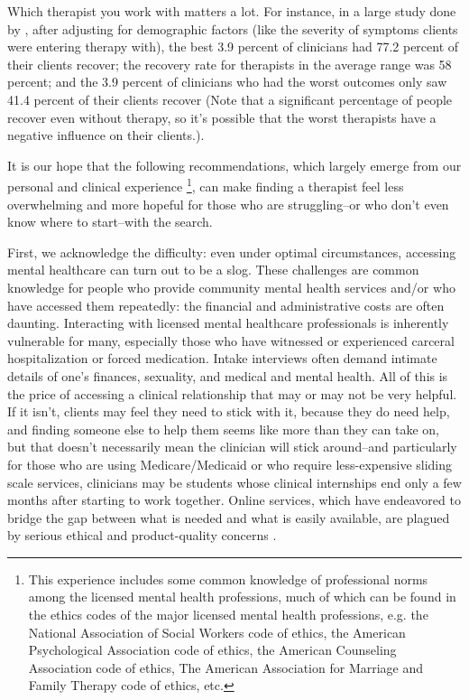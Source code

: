 \documentclass[12pt,letterpaper]{book}
\begin{document}
Which therapist you work with matters a lot. For instance, in a large study done by \textcite{firth2019therapistEffects}, after adjusting for demographic factors (like the severity of symptoms clients were entering therapy with), the best 3.9 percent of clinicians had 77.2 percent of their clients recover; the recovery rate for therapists in the average range was 58 percent; and the 3.9 percent of clinicians who had the worst outcomes only saw 41.4 percent of their clients recover (Note that a significant percentage of people recover even without therapy, so it's possible that the worst therapists have a negative influence on their clients.).

It is our hope that the following recommendations, which largely emerge from our personal and clinical experience \footnote{This experience includes some common knowledge of professional norms among the licensed mental health professions, much of which can be found in the ethics codes of the major licensed mental health professions, e.g. the National Association of Social Workers code of ethics, the American Psychological Association code of ethics, the American Counseling Association code of ethics, The American Association for Marriage and Family Therapy code of ethics, etc.}, can make finding a therapist feel less overwhelming and more hopeful for those who are struggling–or who don't even know where to start–with the search.

First, we acknowledge the difficulty: even under optimal circumstances, accessing mental healthcare can turn out to be a slog. These challenges are common knowledge for people who provide community mental health services and/or who have accessed them repeatedly: the financial and administrative costs are often daunting. Interacting with licensed mental healthcare professionals is inherently vulnerable for many, especially those who have witnessed or experienced carceral hospitalization or forced medication. Intake interviews often demand intimate details of one's finances, sexuality, and medical and mental health. All of this is the price of accessing a clinical relationship that may or may not be very helpful. If it isn't, clients may feel they need to stick with it, because they do need help, and finding someone else to help them seems like more than they can take on, but that doesn't necessarily mean the clinician will stick around–and particularly for those who are using Medicare/Medicaid or who require less-expensive sliding scale services, clinicians may be students whose clinical internships end only a few months after starting to work together. Online services, which have endeavored to bridge the gap between what is needed and what is easily available, are plagued by serious ethical and product-quality concerns \cite{betterhelp1,betterhelp2,betterhelp3,talkspace1,doneglobal1}.
\end{document}
